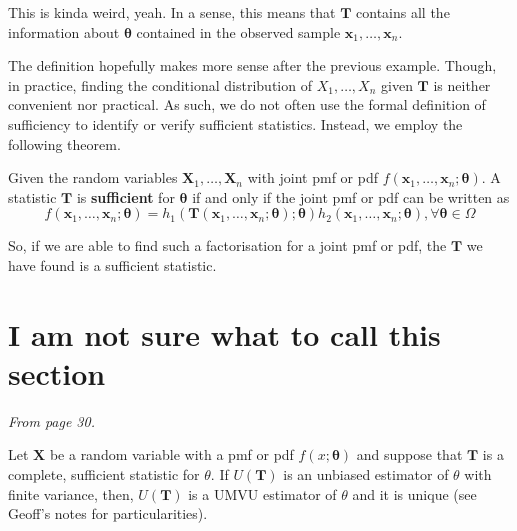 This is kinda weird, yeah. In a sense, this means that \(\bm{T}\) contains 
all the information about \(\bm{\theta}\) contained in the observed sample 
\(\bm{x}_1,\ldots,\bm{x}_n\). 


    

\bigskip

The definition hopefully makes more sense after the previous example. 
Though, in practice, finding the conditional distribution 
of \(X_1,\ldots,X_n\) given \(\bm{T}\) is neither convenient nor practical. 
As such, we do not often use the formal definition of sufficiency 
to identify or verify sufficient statistics. Instead, we employ 
the following theorem.


\begin{theorem}\label{thm:Factorisation Theorem}
    Given the random variables \(\bm{X}_1,\ldots,\bm{X}_n\) with joint pmf or pdf \(f(\bm{x}_1,\ldots,\bm{x}_n;\bm{\theta})\). 
    A statistic \(\bm{T}\) is \textbf{sufficient} for \(\bm{\theta}\) if and only if the joint pmf or pdf can be written as 
    \[f(\bm{x}_1,\ldots,\bm{x}_n;\bm{\theta}) = h_1(\bm{T}(\bm{x}_1,\ldots,\bm{x}_n;\bm{\theta});\bm{\theta})
    h_2(\bm{x}_1,\ldots,\bm{x}_n;\bm{\theta}), \forall\bm{\theta}\in\Omega\]
\end{theorem}

So, if we are able to find such a factorisation for a joint pmf or pdf, 
the \(\bm{T}\) we have found is a sufficient statistic. 

\section{I am not sure what to call this section}\label{sec:Rao-Blackwell??}

\textit{From page 30.}

\begin{theorem}\label{thm:Rao-Blackwell}
    Let \(\bm{X}\) be a random variable with a pmf or pdf \(f(x;\bm{\theta})\) and suppose that \(\bm{T}\) is a complete, sufficient statistic for \(\theta\). 
    If \(U(\bm{T})\) is an unbiased estimator of \(\theta\) with finite variance, 
    then, \(U(\bm{T})\) is a UMVU estimator of \(\theta\) and it is unique (see Geoff's notes for particularities).
\end{theorem}

